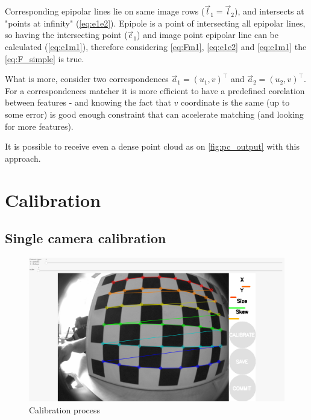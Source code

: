 Corresponding epipolar lines lie on same image rows ($\vec{l}_1 = \vec{l}_2$), and intersects at "points at infinity" (\autoref{eq:e1e2}). 
Epipole is a point of intersecting all epipolar lines, so having the intersecting point ($\vec{e}_1$) and image point epipolar line can be calculated (\autoref{eq:e1m1}), therefore considering \autoref{eq:Fm1}, \autoref{eq:e1e2} and \autoref{eq:e1m1} the \autoref{eq:F_simple} is true.

What is more, consider two correspondences $\vec{a}_1 = (u_1, v)^\top$ and $\vec{a}_2 = (u_2, v)^\top $. For a correspondences matcher it is more efficient to have a predefined corelation between features - and knowing the fact that $v$ coordinate is the same (up to some error) is good enough constraint that can accelerate matching (and looking for more features).

It is possible to receive even a dense point cloud as on \autoref{fig:pc_output} with this approach.


\section{Calibration}
\subsection{Single camera calibration}

\begin{figure}[h]
    \centering
    \includegraphics[width=.6\textwidth]{graphics/calibration.png}
    \caption{Calibration process}
    \label{fig:calib}
\end{figure}

